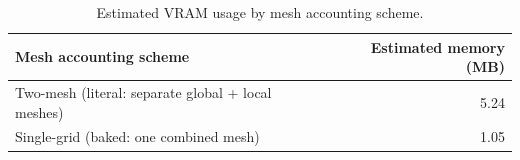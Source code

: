\begin{table}[htb]
\centering
\caption{Estimated VRAM usage by mesh accounting scheme.}
\label{tab:vram}
\footnotesize
\setlength{\tabcolsep}{4pt}
\begin{tabular}{@{}lr@{}}
\toprule
Mesh accounting scheme & Estimated memory (MB) \\
\midrule
Two-mesh (literal: separate global + local meshes) & 5.24 \\
Single-grid (baked: one combined mesh) & 1.05 \\
\bottomrule
\end{tabular}
\end{table}
